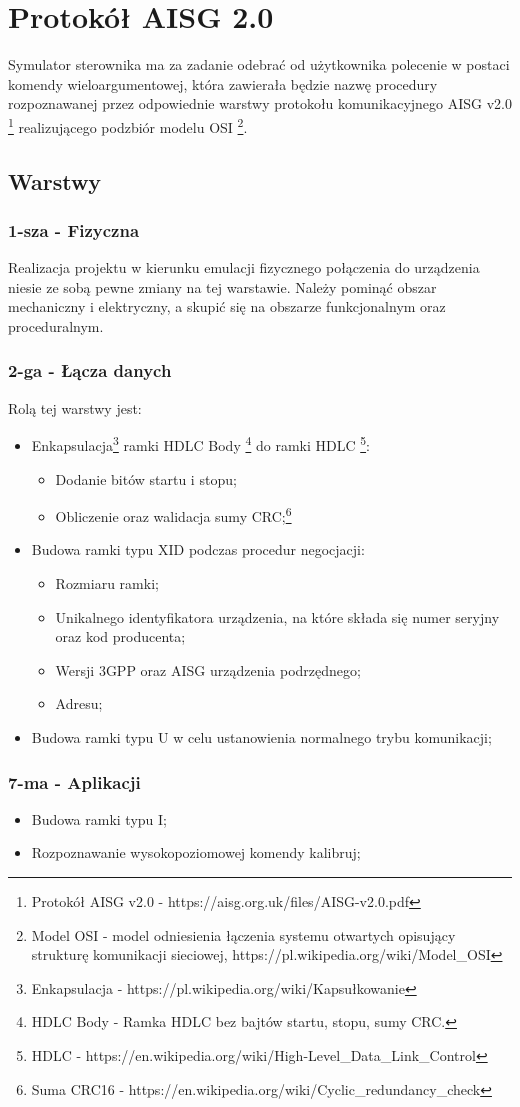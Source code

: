 \chapter{Protokół AISG 2.0}
	Symulator sterownika ma za zadanie odebrać od użytkownika polecenie w postaci komendy wieloargumentowej, 
	która zawierała będzie nazwę procedury rozpoznawanej przez odpowiednie warstwy protokołu komunikacyjnego AISG v2.0
	\footnote{\label{AISG} Protokół AISG v2.0 - https://aisg.org.uk/files/AISG-v2.0.pdf} realizującego podzbiór modelu OSI
	\footnote{\label{Model OSI} Model OSI - model odniesienia łączenia systemu otwartych opisujący strukturę komunikacji sieciowej, https://pl.wikipedia.org/wiki/Model\_OSI}.
	\section{Warstwy}
		\subsection{1-sza - Fizyczna}
		Realizacja projektu w kierunku emulacji fizycznego połączenia do urządzenia niesie ze sobą pewne zmiany na tej warstawie.\newline
		Należy pominąć obszar mechaniczny i elektryczny, a skupić się na obszarze funkcjonalnym oraz proceduralnym.
		\subsection{2-ga - Łącza danych}
		Rolą tej warstwy jest:
		\begin{itemize}
			\item Enkapsulacja\footnote{\label{Enkapsulacja} Enkapsulacja - https://pl.wikipedia.org/wiki/Kapsułkowanie} ramki HDLC Body
			\footnote{\label{HDLC Body} HDLC Body - Ramka HDLC bez bajtów startu, stopu, sumy CRC.} do ramki HDLC
			\footnote{\label{HDLC} HDLC - https://en.wikipedia.org/wiki/High-Level\_Data\_Link\_Control}:
			\begin{itemize}
				\item Dodanie bitów startu i stopu;
				\item Obliczenie oraz walidacja sumy CRC;\footnote{\label{CRC} Suma CRC16 - https://en.wikipedia.org/wiki/Cyclic\_redundancy\_check}
			\end{itemize}
			\item Budowa ramki typu XID podczas procedur negocjacji:
			\begin{itemize}
				\item Rozmiaru ramki;
				\item Unikalnego identyfikatora urządzenia, na które składa się numer seryjny oraz kod producenta;
				\item Wersji 3GPP oraz AISG urządzenia podrzędnego;
				\item Adresu;
			\end{itemize}
			\item Budowa ramki typu U w celu ustanowienia normalnego trybu komunikacji;
		\end{itemize}
		\subsection{7-ma - Aplikacji}
			\begin{itemize}
				\item Budowa ramki typu I;
				\item Rozpoznawanie wysokopoziomowej komendy kalibruj;
			\end{itemize}